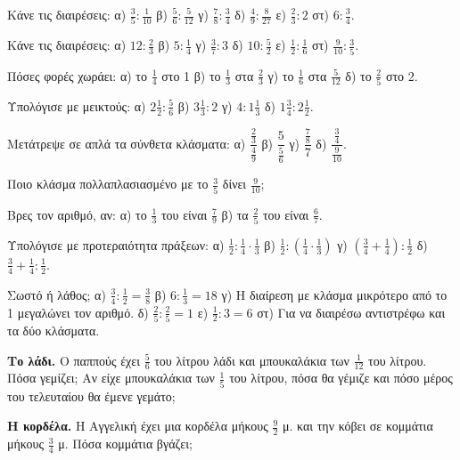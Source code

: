 

\ex Κάνε τις διαιρέσεις: α) $\frac{3}{5}:\frac{1}{10}$ \quad β) $\frac{5}{6}:\frac{5}{12}$ \quad γ) $\frac{7}{8}:\frac{3}{4}$ \quad δ) $\frac{4}{9}:\frac{8}{27}$ \quad ε) $\frac{2}{3}:2$ \quad στ) $6:\frac{3}{4}$.

\ex Κάνε τις διαιρέσεις: α) $12:\frac{2}{3}$ \quad β) $5:\frac{1}{4}$ \quad γ) $\frac{3}{7}:3$ \quad δ) $10:\frac{5}{2}$ \quad ε) $\frac{1}{2}:\frac{1}{6}$ \quad στ) $\frac{9}{10}:\frac{3}{5}$.

\ex Πόσες φορές χωράει: α) το $\frac{1}{4}$ στο 1 \quad β) το $\frac{1}{3}$ στα $\frac{2}{3}$ \quad γ) το $\frac{1}{6}$ στα $\frac{5}{12}$ \quad δ) το $\frac{2}{5}$ στο 2.

\ex Υπολόγισε με μεικτούς: α) $2\frac{1}{2}:\frac{5}{6}$ \quad β) $3\frac{1}{3}:2$ \quad γ) $4:1\frac{1}{3}$ \quad δ) $1\frac{3}{4}:2\frac{1}{2}$.

\ex Μετάτρεψε σε απλά τα σύνθετα κλάσματα: α) $\dfrac{\frac{2}{3}}{\frac{4}{9}}$ \quad β) $\dfrac{5}{\frac{5}{6}}$ \quad γ) $\dfrac{\frac{7}{8}}{7}$ \quad δ) $\dfrac{\frac{3}{4}}{\frac{9}{10}}$.

\ex Ποιο κλάσμα πολλαπλασιασμένο με το $\frac{3}{5}$ δίνει $\frac{9}{10}$;

\ex Βρες τον αριθμό, αν: α) το $\frac{1}{3}$ του είναι $\frac{7}{9}$ \quad β) τα $\frac{2}{5}$ του είναι $\frac{6}{7}$.

\ex Υπολόγισε με προτεραιότητα πράξεων: α) $\frac{1}{2}:\frac{1}{4}\cdot\frac{1}{3}$ \quad β) $\frac{1}{2}:\left(\frac{1}{4}\cdot\frac{1}{3}\right)$ \quad γ) $\left(\frac{3}{4}+\frac{1}{4}\right):\frac{1}{2}$ \quad δ) $\frac{3}{4}+\frac{1}{4}:\frac{1}{2}$.

\ex Σωστό ή λάθος; α) $\frac{3}{4}:\frac{1}{2}=\frac{3}{8}$ \quad β) $6:\frac{1}{3}=18$ \quad γ) Η διαίρεση με κλάσμα μικρότερο από το 1 μεγαλώνει τον αριθμό. \quad δ) $\frac{2}{5}:\frac{2}{5}=1$ \quad ε) $\frac{1}{2}:3=6$ \quad στ) Για να διαιρέσω αντιστρέφω και τα δύο κλάσματα.


\ex \textbf{Το λάδι.} Ο παππούς έχει $\frac{5}{6}$ του λίτρου λάδι και μπουκαλάκια των $\frac{1}{12}$ του λίτρου. Πόσα γεμίζει; Αν είχε μπουκαλάκια των $\frac{1}{5}$ του λίτρου, πόσα θα γέμιζε και πόσο μέρος του τελευταίου θα έμενε γεμάτο;

\ex \textbf{Η κορδέλα.} Η Αγγελική έχει μια κορδέλα μήκους $\frac{9}{2}$ μ. και την κόβει σε κομμάτια μήκους $\frac{3}{4}$ μ. Πόσα κομμάτια βγάζει;

